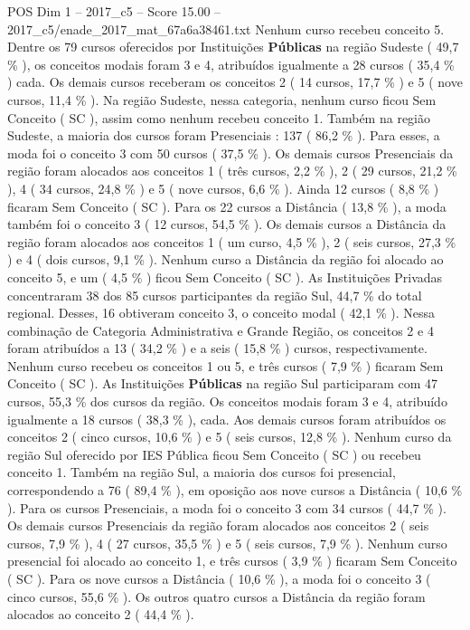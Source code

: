 \begin{textsample}{POS Dim 1 – 2017\_c5 – Score 15.00 – 2017\_c5/enade\_2017\_mat\_67a6a38461.txt}
Nenhum curso recebeu conceito 5.
Dentre os 79 cursos oferecidos por Instituições \textbf{Públicas} na região Sudeste ( 49,7 \% ), os conceitos modais foram 3 e 4, atribuídos igualmente a 28 cursos ( 35,4 \% ) cada.
Os demais cursos receberam os conceitos 2 ( 14 cursos, 17,7 \% ) e 5 ( nove cursos, 11,4 \% ).
Na região Sudeste, nessa categoria, nenhum curso ficou Sem Conceito ( SC ), assim como nenhum recebeu conceito 1.
Também na região Sudeste, a maioria dos cursos foram Presenciais : 137 ( 86,2 \% ).
Para esses, a moda foi o conceito 3 com 50 cursos ( 37,5 \% ).
Os demais cursos Presenciais da região foram alocados aos conceitos 1 ( três cursos, 2,2 \% ), 2 ( 29 cursos, 21,2 \% ), 4 ( 34 cursos, 24,8 \% ) e 5 ( nove cursos, 6,6 \% ).
Ainda 12 cursos ( 8,8 \% ) ficaram Sem Conceito ( SC ).
Para os 22 cursos a Distância ( 13,8 \% ), a moda também foi o conceito 3 ( 12 cursos, 54,5 \% ).
Os demais cursos a Distância da região foram alocados aos conceitos 1 ( um curso, 4,5 \% ), 2 ( seis cursos, 27,3 \% ) e 4 ( dois cursos, 9,1 \% ).
Nenhum curso a Distância da região foi alocado ao conceito 5, e um ( 4,5 \% ) ficou Sem Conceito ( SC ).
As Instituições Privadas concentraram 38 dos 85 cursos participantes da região Sul, 44,7 \% do total regional.
Desses, 16 obtiveram conceito 3, o conceito modal ( 42,1 \% ).
Nessa combinação de Categoria Administrativa e Grande Região, os conceitos 2 e 4 foram atribuídos a 13 ( 34,2 \% ) e a seis ( 15,8 \% ) cursos, respectivamente.
Nenhum curso recebeu os conceitos 1 ou 5, e três cursos ( 7,9 \% ) ficaram Sem Conceito ( SC ).
As Instituições \textbf{Públicas} na região Sul participaram com 47 cursos, 55,3 \% dos cursos da região.
Os conceitos modais foram 3 e 4, atribuído igualmente a 18 cursos ( 38,3 \% ), cada.
Aos demais cursos foram atribuídos os conceitos 2 ( cinco cursos, 10,6 \% ) e 5 ( seis cursos, 12,8 \% ).
Nenhum curso da região Sul oferecido por IES Pública ficou Sem Conceito ( SC ) ou recebeu conceito 1.
Também na região Sul, a maioria dos cursos foi presencial, correspondendo a 76 ( 89,4 \% ), em oposição aos nove cursos a Distância ( 10,6 \% ).
Para os cursos Presenciais, a moda foi o conceito 3 com 34 cursos ( 44,7 \% ).
Os demais cursos Presenciais da região foram alocados aos conceitos 2 ( seis cursos, 7,9 \% ), 4 ( 27 cursos, 35,5 \% ) e 5 ( seis cursos, 7,9 \% ).
Nenhum curso presencial foi alocado ao conceito 1, e três cursos ( 3,9 \% ) ficaram Sem Conceito ( SC ).
Para os nove cursos a Distância ( 10,6 \% ), a moda foi o conceito 3 ( cinco cursos, 55,6 \% ).
Os outros quatro cursos a Distância da região foram alocados ao conceito 2 ( 44,4 \% ).

\end{textsample}

